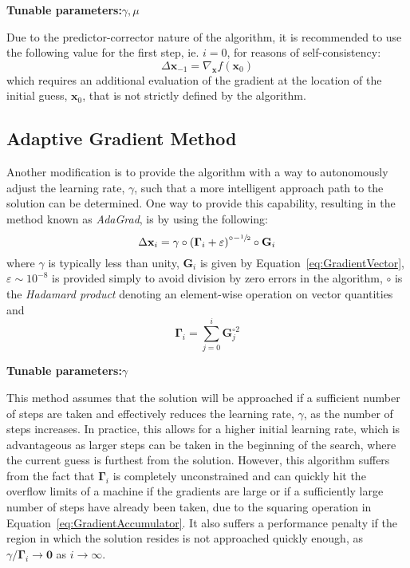 \documentclass{article}
\begin{document}
\begin{center}
	\textbf{Tunable parameters:}\hspace{20pt}$\gamma,\mu$
\end{center}

Due to the predictor-corrector nature of the algorithm, it is recommended to use the following value for the first step, ie. $i=0$, for reasons of self-consistency:
\begin{equation}
\label{eq:NesterovFirstUpdate}
	\Delta \mathbf{x}_{-1} = \nabla_{\mathbf{x}} f\!\left(\mathbf{x}_0\right)
\end{equation}
which requires an additional evaluation of the gradient at the location of the initial guess, $\mathbf{x}_0$, that is not strictly defined by the algorithm.

\subsection{Adaptive Gradient Method}
\label{subsec:AdaGrad}

Another modification is to provide the algorithm with a way to autonomously adjust the learning rate, $\gamma$, such that a more intelligent approach path to the solution can be determined. One way to provide this capability, resulting in the method known as \emph{AdaGrad}, is by using the following:
\begin{equation}
\label{eq:SE_AdaGrad}
	\Delta \mathbf{x}_i = \gamma \circ \left(\mathbf{\Gamma}_i + \varepsilon\right)^{ \circ-\sfrac{1}{2}} \circ \mathbf{G}_i
\end{equation}
where $\gamma$ is typically less than unity, $\mathbf{G}_i$ is given by Equation~\eqref{eq:GradientVector}, $\varepsilon \sim 10^{-8}$ is provided simply to avoid division by zero errors in the algorithm, $\circ$ is the \emph{Hadamard product} denoting an element-wise operation on vector quantities and
\begin{equation}
\label{eq:GradientAccumulator}
	\mathbf{\Gamma}_i = \sum_{j=0}^{i} \mathbf{G}_j^{\circ 2}
\end{equation}

\begin{center}
	\textbf{Tunable parameters:}\hspace{20pt}$\gamma$
\end{center}

This method assumes that the solution will be approached if a sufficient number of steps are taken and effectively reduces the learning rate, $\gamma$, as the number of steps increases. In practice, this allows for a higher initial learning rate, which is advantageous as larger steps can be taken in the beginning of the search, where the current guess is furthest from the solution. However, this algorithm suffers from the fact that $\mathbf{\Gamma}_i$ is completely unconstrained and can quickly hit the overflow limits of a machine if the gradients are large or if a sufficiently large number of steps have already been taken, due to the squaring operation in Equation~\eqref{eq:GradientAccumulator}. It also suffers a performance penalty if the region in which the solution resides is not approached quickly enough, as $\gamma / \mathbf{\Gamma}_i \rightarrow \mathbf{0}$ as $i \rightarrow \infty$.
\end{document}
